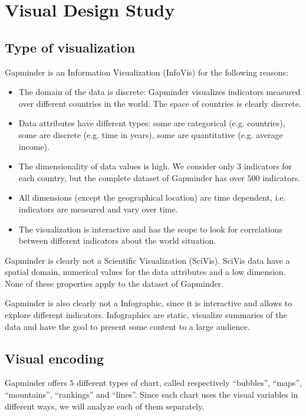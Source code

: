 \section{Visual Design Study}
\label{sec:visual_design}

\subsection{Type of visualization}
Gapminder is an Information Visualization (InfoVis) for the following reasons:
\begin{itemize}
    \item The domain of the data is discrete: Gapminder visualizes indicators measured over different countries in the world. The space of countries is clearly discrete.
    \item Data attributes have different types: some are categorical (e.g. countries), some are discrete (e.g. time in years), some are quantitative (e.g. average income). 
    \item The dimensionality of data values is high. We consider only $3$ indicators for each country, but the complete dataset of Gapminder has over $500$ indicators.
    \item All dimensions (except the geographical location) are time dependent, i.e. indicators are measured and vary over time.
    \item The visualization is interactive and has the scope to look for correlations between different indicators about the world situation.
\end{itemize}

Gapminder is clearly not a Scientific Visualization (SciVis).
SciVis data have a spatial domain, numerical values for the data attributes and a low dimension.
None of these properties apply to the dataset of Gapminder.

Gapminder is also clearly not a Infographic, since it is interactive and allows to explore different indicators.
Infographics are static, visualize summaries of the data and have the goal to present some content to a large audience.

\subsection{Visual encoding}
Gapminder offers $5$ different types of chart, called respectively ``bubbles'', ``maps'', ``mountains'', ``rankings'' and ``lines''.
Since each chart uses the visual variables in different ways, we will analyze each of them separately.

